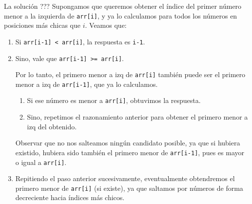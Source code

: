\documentclass{beamer}
\begin{document}
    \begin{frame}{La solución ???}
        Supongamos que queremos obtener el índice del primer número menor a la izquierda de \texttt{arr[i]}, y ya lo calculamos para todos los números en posiciones más chicas que $i$. \pause Veamos que: \pause

        \begin{enumerate}
            \item Si \texttt{arr[i-1] < arr[i]}, la respuesta es \texttt{i-1}. \pause
            \item Sino, vale que \texttt{arr[i-1] >= arr[i]}. \pause 

                Por lo tanto, el primero menor a izq de \texttt{arr[i]} también puede ser el primero menor a izq de \texttt{arr[i-1]}, que ya lo calculamos. \pause

                \begin{enumerate}
                    \item Si ese número es menor a \texttt{arr[i]}, obtuvimos la respuesta. \pause

                    \item Sino, repetimos el razonamiento anterior para obtener el primero menor a izq del obtenido. \pause

                \end{enumerate}
                Observar que no nos salteamos ningún candidato posible, ya que si hubiera existido, hubiera sido también el primero menor de \texttt{arr[i-1]}, pues es mayor o igual a \texttt{arr[i]}.\pause

            \item Repitiendo el paso anterior sucesivamente, eventualmente obtendremos el primero menor de \texttt{arr[i]} (si existe), ya que saltamos por números de forma decreciente hacia índices más chicos.
        \end{enumerate}
    \end{frame}
\end{document}
